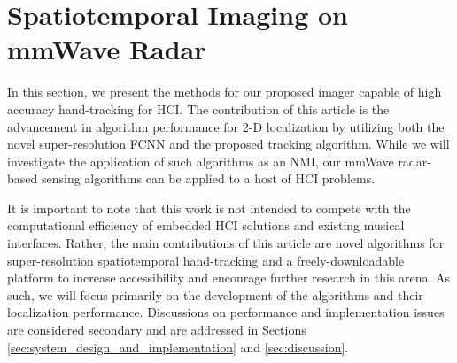 \documentclass[10pt,journal,final]{IEEEtran}
\begin{document}



\section{Spatiotemporal Imaging on mmWave Radar}
\label{sec:the_radar_musical_instrument}

In this section, we present the methods for our proposed imager capable of high accuracy hand-tracking for HCI. %
The contribution of this article is the advancement in algorithm performance for 2-D localization by utilizing both the novel super-resolution FCNN and the proposed tracking algorithm. 
While we will investigate the application of such algorithms as an NMI, our mmWave radar-based sensing algorithms can be applied to a host of HCI problems.

It is important to note that this work is not intended to compete with the computational efficiency of embedded HCI solutions and existing musical interfaces. 
Rather, the main contributions of this article are novel algorithms for super-resolution spatiotemporal hand-tracking and a freely-downloadable platform to increase accessibility and encourage further research in this arena. 
As such, we will focus primarily on the development of the algorithms and their localization performance.
Discussions on performance and implementation issues are considered secondary and are addressed in Sections \ref{sec:system_design_and_implementation} and \ref{sec:discussion}.
\end{document}
